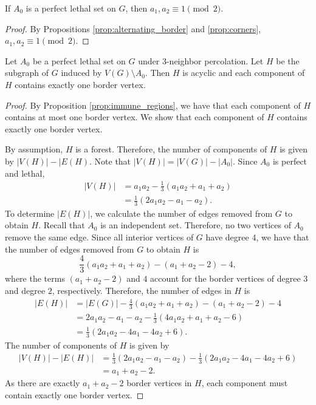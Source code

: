 \begin{prop}
\label{prop:odd_by_odd}
If $A_0$ is a perfect lethal set on $G$, then $a_1, a_2 \equiv 1 \pmod 2$.
\end{prop}

\begin{proof}
By Propositions \ref{prop:alternating_border} and \ref{prop:corners}, $a_1, a_2 \equiv 1 \pmod 2$.
\end{proof}

\begin{prop}
\label{prop:one_border_vertex}
Let $A_0$ be a perfect lethal set on $G$ under $3$-neighbor percolation. Let $H$ be the subgraph of $G$ induced by $V(G) \setminus A_0$. Then $H$ is acyclic and each component of $H$ contains exactly one border vertex.
\end{prop}

\begin{proof}
By Proposition \ref{prop:immune_regions}, we have that each component of $H$ contains at most one border vertex. We show that each component of $H$ contains exactly one border vertex.

By assumption, $H$ is a forest. Therefore, the number of components of $H$ is given by $|V(H)| - |E(H)$. Note that $|V(H)| = |V(G)| - |A_0|$. Since $A_0$ is perfect and lethal,
\begin{align*}
|V(H)| &= a_1a_2 - \frac{1}{3}(a_1a_2+a_1+a_2) \\
&= \frac{1}{3}(2a_1a_2-a_1-a_2).
\end{align*}
To determine $|E(H)|$, we calculate the number of edges removed from $G$ to obtain $H$. Recall that $A_0$ is an independent set. Therefore, no two vertices of $A_0$ remove the same edge. Since all interior vertices of $G$ have degree 4, we have that the number of edges removed from $G$ to obtain $H$ is
$$\frac{4}{3} \left(a_1a_2+a_1+a_2 \right) - (a_1+a_2-2) - 4,$$
where the terms $(a_1+a_2-2)$ and $4$ account for the border vertices of degree $3$ and degree $2$, respectively. Therefore, the number of edges in $H$ is
\begin{align*}
|E(H)| &= |E(G)| - \frac{4}{3} \left(a_1a_2+a_1+a_2 \right) - (a_1+a_2-2) - 4 \\
&= 2a_1a_2 -a_1 -a_2 - \frac{1}{3}(4a_1a_2+a_1+a_2-6) \\
&= \frac{1}{3}(2a_1a_2-4a_1-4a_2+6).
\end{align*}
The number of components of $H$ is given by
\begin{align*}
|V(H)| -|E(H)| &= \frac{1}{3}(2a_1a_2-a_1-a_2) - \frac{1}{3}(2a_1a_2-4a_1-4a_2+6) \\
&= a_1 + a_2 -2.
\end{align*}
As there are exactly $a_1 + a_2 - 2$ border vertices in $H$, each component must contain exactly one border vertex.
\end{proof}


